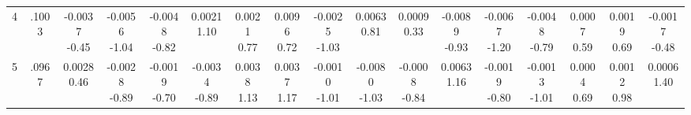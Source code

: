 \begin{landscape}
\begin{center}
{\begin{adjustbox}{max width=\textheight}
\begin{tabular}{lcccccccccccccccc}
4 & .1003 & \shortstack{-0.0037\\-0.45} & \shortstack{-0.0056\\-1.04} & \shortstack{-0.0048\\-0.82} & \shortstack{0.0021\\1.10} & \shortstack{0.0021\\0.77} & \shortstack{0.0096\\0.72} & \shortstack{-0.0025\\-1.03} & \shortstack{0.0063\\0.81} & \shortstack{0.0009\\0.33} & \shortstack{-0.0089\\-0.93} & \shortstack{-0.0067\\-1.20} & \shortstack{-0.0048\\-0.79} & \shortstack{0.0007\\0.59} & \shortstack{0.0019\\0.69} & \shortstack{-0.0017\\-0.48} \\
5 & .0967 & \shortstack{0.0028\\0.46} & \shortstack{-0.0028\\-0.89} & \shortstack{-0.0019\\-0.70} & \shortstack{-0.0034\\-0.89} & \shortstack{0.0038\\1.13} & \shortstack{0.0037\\1.17} & \shortstack{-0.0010\\-1.01} & \shortstack{-0.0080\\-1.03} & \shortstack{-0.0008\\-0.84} & \shortstack{0.0063\\1.16} & \shortstack{-0.0019\\-0.80} & \shortstack{-0.0013\\-1.01} & \shortstack{0.0004\\0.69} & \shortstack{0.0012\\0.98} & \shortstack{0.0006\\1.40} \\

\end{tabular}
\end{adjustbox}}
\end{center}
\end{landscape}
